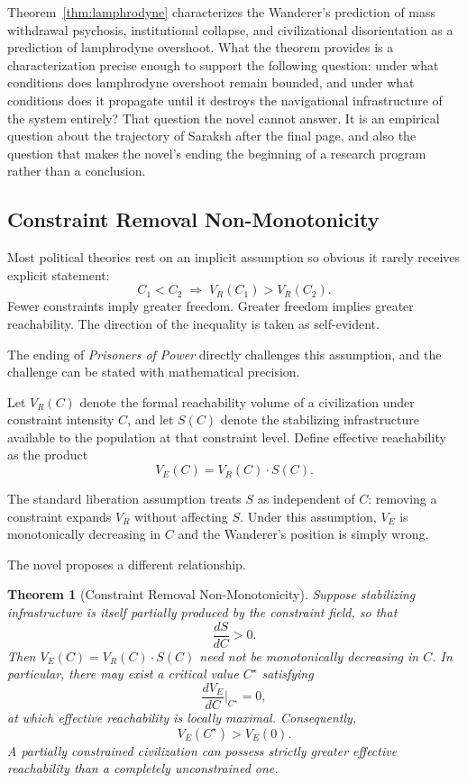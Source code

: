 \documentclass[12pt, a4paper]{article}
\theoremstyle{plain}
\newtheorem{theorem}{Theorem}[section]
\theoremstyle{definition}
\theoremstyle{remark}
\begin{document}
Theorem~\ref{thm:lamphrodyne} characterizes the
Wanderer's prediction of mass withdrawal psychosis,
institutional collapse, and civilizational
disorientation as a prediction of lamphrodyne
overshoot. What the theorem provides is a
characterization precise enough to support the
following question: under what conditions does
lamphrodyne overshoot remain bounded, and under
what conditions does it propagate until it destroys
the navigational infrastructure of the system
entirely? That question the novel cannot answer.
It is an empirical question about the trajectory
of Saraksh after the final page, and also the
question that makes the novel's ending the
beginning of a research program rather than
a conclusion.

\subsection{Constraint Removal Non-Monotonicity}

Most political theories rest on an implicit
assumption so obvious it rarely receives
explicit statement:
\[
C_1 < C_2 \;\Longrightarrow\; V_R(C_1) > V_R(C_2).
\]
Fewer constraints imply greater freedom. Greater
freedom implies greater reachability. The direction
of the inequality is taken as self-evident.

The ending of \textit{Prisoners of Power} directly
challenges this assumption, and the challenge can
be stated with mathematical precision.

Let $V_R(C)$ denote the formal reachability volume
of a civilization under constraint intensity $C$,
and let $S(C)$ denote the stabilizing infrastructure
available to the population at that constraint level.
Define effective reachability as the product
\[
V_E(C) = V_R(C)\cdot S(C).
\]

The standard liberation assumption treats $S$ as
independent of $C$: removing a constraint expands
$V_R$ without affecting $S$. Under this assumption,
$V_E$ is monotonically decreasing in $C$ and the
Wanderer's position is simply wrong.

The novel proposes a different relationship.

\begin{theorem}[Constraint Removal Non-Monotonicity]
\label{thm:nonmonotone}
Suppose stabilizing infrastructure is itself
partially produced by the constraint field, so that
\[
\frac{dS}{dC} > 0.
\]
Then $V_E(C) = V_R(C)\cdot S(C)$ need not be
monotonically decreasing in $C$. In particular,
there may exist a critical value $C^\star$ satisfying
\[
\frac{dV_E}{dC}\bigg|_{C^\star} = 0,
\]
at which effective reachability is locally maximal.
Consequently,
\[
V_E(C^\star) > V_E(0).
\]
A partially constrained civilization can possess
strictly greater effective reachability than a
completely unconstrained one.
\end{theorem}
\end{document}

